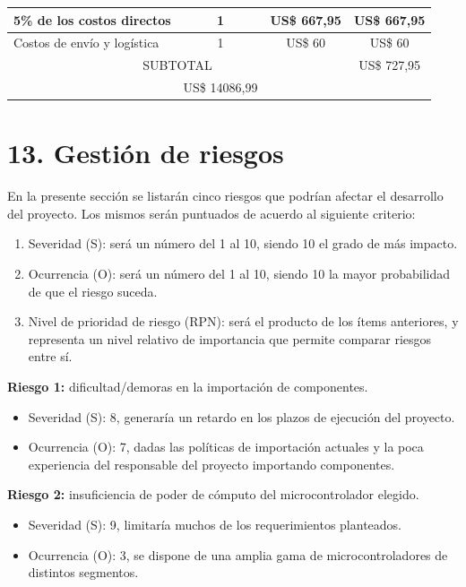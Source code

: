 \documentclass[
11pt, %
]{charter}
\begin{document}
\begin{table}[htpb]
\begin{tabularx}{\linewidth}{@{}|X|c|r|r|@{}}
5\% de los costos directos &
\multicolumn{1}{c|}{1} &
\multicolumn{1}{c|}{US\$ 667,95} &
\multicolumn{1}{c|}{US\$ 667,95} \\ \hline

Costos de envío y logística &
\multicolumn{1}{c|}{1} &
\multicolumn{1}{c|}{US\$ 60} &
\multicolumn{1}{c|}{US\$ 60} \\ \hline

\multicolumn{3}{|c|}{SUBTOTAL} &
  \multicolumn{1}{c|}{US\$ 727,95} \\ \hline
\rowcolor[HTML]{C0C0C0}
\multicolumn{3}{|c|}{TOTAL} & \multicolumn{1}{c|}{US\$ 14086,99}
   \\ \hline
\end{tabularx}%
\end{table}


\section{13. Gestión de riesgos}
\label{sec:riesgos}

En la presente sección se listarán cinco riesgos que podrían afectar el desarrollo del proyecto. Los mismos serán puntuados de acuerdo al siguiente criterio:
\begin{enumerate}
	\item Severidad (S): será un número del 1 al 10, siendo 10 el grado de más impacto.
	\item Ocurrencia (O): será un número del 1 al 10, siendo 10 la mayor probabilidad de que el riesgo suceda.
	\item Nivel de prioridad de riesgo (RPN): será el producto de los ítems anteriores, y representa un nivel relativo de importancia que permite comparar riesgos entre sí. 
\end{enumerate}

\textbf{Riesgo 1:} dificultad/demoras en la importación de componentes.
\begin{itemize}
	\item Severidad (S): 8, generaría un retardo en los plazos de ejecución del proyecto.
	\item Ocurrencia (O): 7, dadas las políticas de importación actuales y la poca experiencia del responsable del proyecto importando componentes. 
\end{itemize}

\textbf{Riesgo 2:} insuficiencia de poder de cómputo del microcontrolador elegido.
\begin{itemize}
	\item Severidad (S): 9, limitaría muchos de los requerimientos planteados.
	\item Ocurrencia (O): 3, se dispone de una amplia gama de microcontroladores de distintos segmentos. 
\end{itemize}
\end{document}
